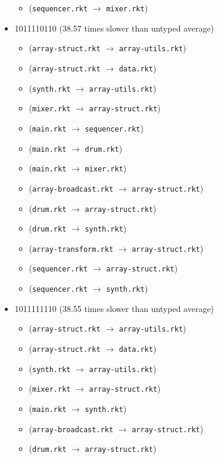 \documentclass{article}
\newcommand{\mono}[1]{\texttt{#1}}
\begin{document}
\begin{itemize}
\begin{itemize}
  \item (\mono{sequencer.rkt} $\rightarrow$ \mono{mixer.rkt})
  \end{itemize}
\item 1011110110 (38.57 times slower than untyped average)
  \begin{itemize}
  \item (\mono{array-struct.rkt} $\rightarrow$ \mono{array-utils.rkt})
  \item (\mono{array-struct.rkt} $\rightarrow$ \mono{data.rkt})
  \item (\mono{synth.rkt} $\rightarrow$ \mono{array-utils.rkt})
  \item (\mono{mixer.rkt} $\rightarrow$ \mono{array-struct.rkt})
  \item (\mono{main.rkt} $\rightarrow$ \mono{sequencer.rkt})
  \item (\mono{main.rkt} $\rightarrow$ \mono{drum.rkt})
  \item (\mono{main.rkt} $\rightarrow$ \mono{mixer.rkt})
  \item (\mono{array-broadcast.rkt} $\rightarrow$ \mono{array-struct.rkt})
  \item (\mono{drum.rkt} $\rightarrow$ \mono{array-struct.rkt})
  \item (\mono{drum.rkt} $\rightarrow$ \mono{synth.rkt})
  \item (\mono{array-transform.rkt} $\rightarrow$ \mono{array-struct.rkt})
  \item (\mono{sequencer.rkt} $\rightarrow$ \mono{array-struct.rkt})
  \item (\mono{sequencer.rkt} $\rightarrow$ \mono{synth.rkt})
  \end{itemize}
\item 1011111110 (38.55 times slower than untyped average)
  \begin{itemize}
  \item (\mono{array-struct.rkt} $\rightarrow$ \mono{array-utils.rkt})
  \item (\mono{array-struct.rkt} $\rightarrow$ \mono{data.rkt})
  \item (\mono{synth.rkt} $\rightarrow$ \mono{array-utils.rkt})
  \item (\mono{mixer.rkt} $\rightarrow$ \mono{array-struct.rkt})
  \item (\mono{main.rkt} $\rightarrow$ \mono{synth.rkt})
  \item (\mono{array-broadcast.rkt} $\rightarrow$ \mono{array-struct.rkt})
  \item (\mono{drum.rkt} $\rightarrow$ \mono{array-struct.rkt})

\end{itemize}
\end{itemize}
\end{document}
